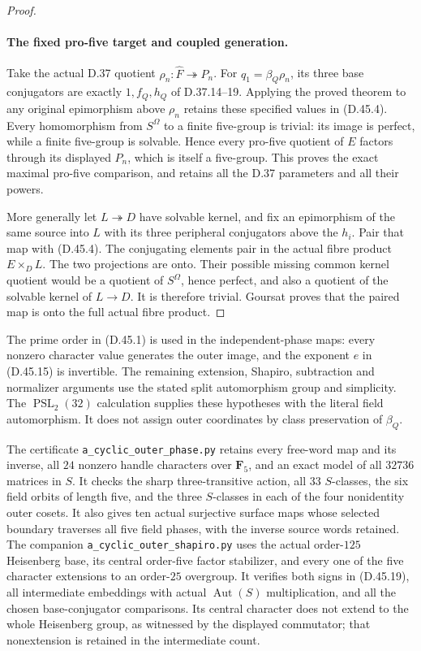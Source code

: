 \begin{proof}
\paragraph{The fixed pro-five target and coupled generation.}
Take the actual D.37 quotient
\(\rho_n:\widehat F\twoheadrightarrow P_n\).
For \(q_1=\beta_Q\rho_n\), its three base
conjugators are exactly \(1,f_Q,h_Q\) of
D.37.14--19. Applying the proved theorem to
any original epimorphism above \(\rho_n\)
retains these specified values in
\textup{(D.45.4)}.
Every homomorphism from \(S^\Omega\) to a
finite five-group is trivial: its image is
perfect, while a finite five-group is solvable.
Hence every pro-five quotient of \(E\)
factors through its displayed \(P_n\), which
is itself a five-group.
This proves the exact maximal pro-five
comparison, and retains all the D.37
parameters and all their powers.

More generally let \(L\twoheadrightarrow D\)
have solvable kernel, and fix an epimorphism
of the same source into \(L\) with its three
peripheral conjugators above the \(h_i\).
Pair that map with \textup{(D.45.4)}.
The conjugating elements pair in the actual
fibre product \(E\times_D L\).
The two projections are onto. Their possible
missing common kernel quotient would be a
quotient of \(S^\Omega\), hence perfect, and
also a quotient of the solvable kernel of
\(L\to D\). It is therefore trivial.
Goursat proves that the paired map is onto
the full actual fibre product.
\end{proof}

The prime order in \textup{(D.45.1)} is used in
the independent-phase maps: every nonzero
character value generates the outer image,
and the exponent \(e\) in
\textup{(D.45.15)} is invertible.
The remaining extension, Shapiro, subtraction
and normalizer arguments use the stated
split automorphism group and simplicity.
The \(\operatorname{PSL}_2(32)\) calculation
supplies these hypotheses with the literal
field automorphism. It does not assign
outer coordinates by class preservation of
\(\beta_Q\).

The certificate \texttt{a\_cyclic\_outer\_phase.py}
retains every free-word map and its inverse,
all \(24\) nonzero handle characters over
\(\mathbf F_5\), and an exact model of all
\(32736\) matrices in \(S\).
It checks the sharp three-transitive action,
all \(33\) \(S\)-classes, the six field orbits
of length five, and the three \(S\)-classes
in each of the four nonidentity outer
cosets. It also gives ten actual surjective
surface maps whose selected boundary
traverses all five field phases, with the
inverse source words retained.
The companion
\texttt{a\_cyclic\_outer\_shapiro.py}
uses the actual order-\(125\) Heisenberg base,
its central order-five factor stabilizer,
and every one of the five character
extensions to an order-\(25\) overgroup.
It verifies both signs in
\textup{(D.45.19)}, all intermediate
embeddings with actual
\(\operatorname{Aut}(S)\) multiplication,
and all the chosen base-conjugator
comparisons. Its central character does
not extend to the whole Heisenberg group,
as witnessed by the displayed commutator;
that nonextension is retained in the
intermediate count.
